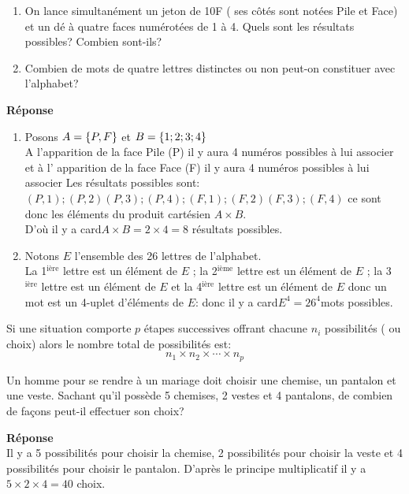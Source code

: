 \begin{exercice}
\begin{enumerate}
\item On lance  simultanément un jeton de 10F ( ses  côtés sont notées Pile et  Face) et  un dé  à quatre faces numérotées de 1  à 4. Quels sont les résultats possibles? Combien sont-ils?
\item Combien de mots de quatre lettres distinctes ou non peut-on constituer avec l'alphabet?
\end{enumerate}
\end{exercice}
\textbf{Réponse}\\
\begin{enumerate}
\item Posons $ A=\left\{P, F\right\} $ et $ B= \left\{1; 2; 3; 4\right\} $\\
A l'apparition de la face Pile (P) il y aura 4 numéros possibles à lui associer et à l' apparition de la face Face (F) il y aura 4 numéros possibles à lui associer
Les résultats possibles sont: $ (P,1); (P,2)(P,3); (P,4);(F,1); (F,2)(F,3); (F,4) $ ce sont donc les éléments du produit cartésien $ A \times B $.\\
D'où il y a card$ A \times B=2 \times4=8 $ résultats possibles.

\item Notons $ E $ l'ensemble des 26 lettres de l'alphabet.\\
La  1$^{\text{ière}}$ lettre est un élément de $ E$ ; la  2$^{\text{ième}}$ lettre est un élément de $ E$ ; la  3$^{\text{ière}}$ lettre est un élément de $ E$ et la  4$^{\text{ière}}$ lettre est un élément de $ E$  donc un mot est un 4-uplet d'éléments de $ E $: donc il y a  card$ E^{4} =26^{4}$mots possibles.
\end{enumerate}
\begin{corollary}

Si une situation comporte $ p $  étapes successives offrant chacune $ n_{i} $ possibilités ( ou choix) alors le nombre total de possibilités est:
\[n_{1}\times n_{2} \times \cdots \times n_{p} \]
\end{corollary}
\begin{example}
Un homme pour se rendre à un  mariage  doit choisir une chemise, un pantalon et une veste.  Sachant qu'il possède 5 chemises, 2 vestes et 4 pantalons, de combien de façons peut-il effectuer son choix?
\bigskip

\textbf{Réponse}\\
Il y a 5 possibilités pour choisir la chemise, 2 possibilités pour choisir la veste et 4 possibilités pour choisir le pantalon. D'après le principe multiplicatif il y a $ 5\times 2\times 4= 40 $ choix.
\end{example}
